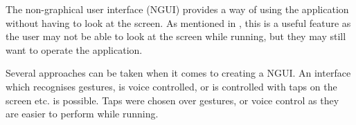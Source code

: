 The non-graphical user interface (NGUI) provides a way of using the application without having to look at the screen. As mentioned in , this is a useful feature as the user may not be able to look at the screen while running, but they may still want to operate the application.

Several approaches can be taken when it comes to creating a NGUI. An interface which recognises gestures, is voice controlled, or is controlled with taps on the screen etc. is possible. Taps were chosen over gestures, or voice control as they are easier to perform while running. 

